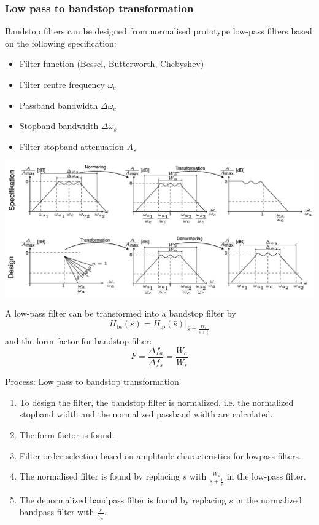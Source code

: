 \subsubsection{Low pass to bandstop transformation}
Bandstop filters can be designed from normalised prototype low-pass filters based on the following specification:
\begin{itemize}
  \item Filter function (Bessel, Butterworth, Chebyshev) 
  \item Filter centre frequency $\omega_{c}$ 
  \item Passband bandwidth $\Delta\omega_{c}$ 
  \item Stopband bandwidth $\Delta\omega_{s}$ 
  \item Filter stopband attenuation $A_{s}$
\end{itemize}

\begin{center}
  \includegraphics[width=\textwidth]{Images/LP-to-BP.png} 
\end{center}
A low-pass filter can be transformed into a bandstop filter by
$$H_{\text{bs}}(s)=H_{\text{lp}}(\bar{s})|_{\bar{s}=\frac{W_{a}}{s+\frac{1}{s}}}$$
and the form factor for bandstop filter:
$$F=\frac{\Delta f_{a}}{\Delta f_{s}}=\frac{W_{a}}{W_{s}}$$

Process: Low pass to bandstop transformation
\begin{enumerate}
  \item To design the filter, the bandstop filter is normalized, i.e. the normalized stopband width and the normalized passband width are calculated.
  \item The form factor is found.
  \item Filter order selection based on amplitude characteristics for lowpass filters.
  \item The normalised filter is found by replacing $s$ with $\frac{W_{a}}{s+\frac{1}{s}}$ in the low-pass filter.
  \item The denormalized bandpass filter is found by replacing $s$ in the normalized bandpass filter with $\frac{s}{\omega_{c}}$.
\end{enumerate}
